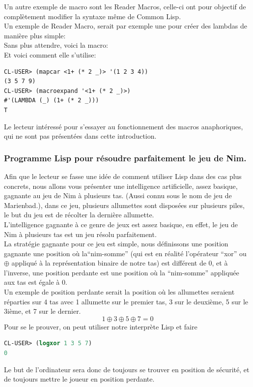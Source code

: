 \documentclass[a4paper, 12pt]{article}
\numberwithin{equation}{subsection}
\begin{document}
Un autre exemple de macro sont les Reader Macros, celle-ci ont pour objectif de complètement modifier la syntaxe même de Common Lisp. \\

Un exemple de Reader Macro, serait par exemple une pour créer des lambdas de manière plus simple:\\

Sans plus attendre, voici la macro: \\

Et voici comment elle s'utilise: \\
\begin{lstlisting}
CL-USER> (mapcar <1+ (* 2 _)> '(1 2 3 4))
(3 5 7 9)
CL-USER> (macroexpand '<1+ (* 2 _)>)
#'(LAMBDA (_) (1+ (* 2 _)))
T
\end{lstlisting}
Le lecteur intéressé pour s'essayer au fonctionnement des macros anaphoriques, qui ne sont pas présentées dans cette introduction.\\
\subsubsection{Programme Lisp pour résoudre parfaitement le jeu de Nim.}
Afin que le lecteur se fasse une idée de comment utiliser Lisp dans des cas plus concrets, nous allons vous présenter une intelligence artificielle, assez basique, gagnante au jeu de Nim à plusieurs tas. (Aussi connu sous le nom de jeu de Marienbad.), dans ce jeu, plusieurs allumettes sont disposées sur plusieurs piles, le but du jeu est de récolter la dernière allumette. \\

L'intelligence gagnante à ce genre de jeux est assez basique, en effet, le jeu de Nim à plusieurs tas est un jeu résolu parfaitement. \\

La stratégie gagnante pour ce jeu est simple, nous définissons une position gagnante une position où la``nim-somme'' (qui est en réalité l'opérateur ``xor'' ou $\oplus$ appliqué à la représentation binaire de notre tas) est différent de 0, et à l'inverse, une position perdante est une position où la ``nim-somme'' appliquée aux tas est égale à 0. \\

Un exemple de position perdante serait la position où les allumettes seraient réparties sur 4 tas avec 1 allumette sur le premier tas, 3 sur le deuxième, 5 sur le 3ième, et 7 sur le dernier. \\
$$1 \oplus 3 \oplus 5 \oplus 7 = 0$$
Pour se le prouver, on peut utiliser notre interprète Lisp et faire
\begin{lstlisting}[language=Lisp]
CL-USER> (logxor 1 3 5 7)
0
\end{lstlisting}
Le but de l'ordinateur sera donc de toujours se trouver en position de sécurité, et de toujours mettre le joueur en position perdante. \\
\end{document}
